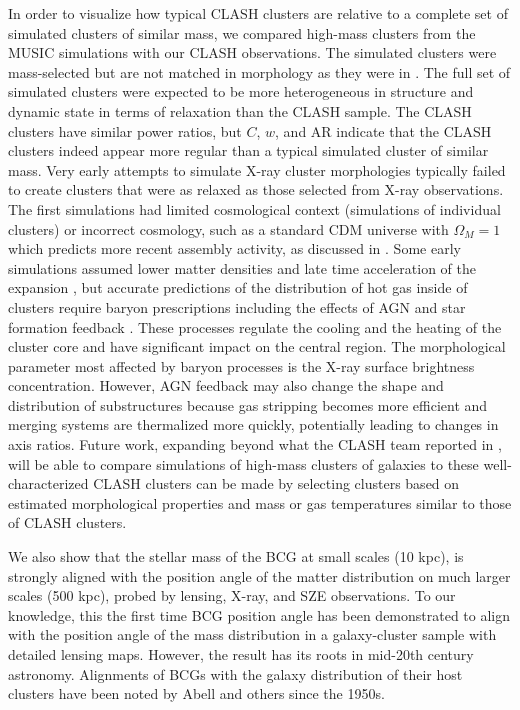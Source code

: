 \documentclass[iop,twocolumn]{emulateapj}
\begin{document}
{In order to visualize how typical CLASH clusters are relative to a complete set of simulated clusters
of similar mass, 
we compared high-mass clusters from the MUSIC simulations \citep{2014ApJ...797...34M}
with our CLASH observations. The simulated clusters were mass-selected but are not matched in morphology 
as they were in \citet{2014ApJ...797...34M}.
The full set of simulated clusters were expected to be more heterogeneous in structure and dynamic state in terms of relaxation than the CLASH sample. 
The CLASH clusters have similar power ratios, but $C$, $w$, and AR indicate
that the CLASH clusters indeed appear more regular than a typical simulated cluster of similar mass. 
Very early attempts to simulate X-ray cluster morphologies typically failed to create 
clusters that were as relaxed as those selected from X-ray observations. 
The first simulations had limited cosmological context (simulations of individual 
clusters) or incorrect cosmology, such as 
a standard CDM universe with $\Omega_M=1$ which predicts more recent assembly activity, 
as discussed in \citep{1996MNRAS.282...77T,1997MNRAS.284..439B}.  Some early simulations assumed 
lower matter densities  \citep{1993ApJ...419L...9E,1995ApJ...447....8M} and late time acceleration of the expansion \citep{1998MNRAS.296.1061T}, 
but accurate predictions 
of the distribution of hot gas inside of clusters require baryon prescriptions including
the effects of AGN and star formation feedback \citep{rasia.etal.2015}.
These processes regulate the cooling and the heating of the cluster core and have significant impact
on the central region. The morphological parameter most affected by baryon processes is the X-ray surface brightness concentration.
However, AGN feedback may also change the shape and distribution of substructures because gas stripping 
becomes more efficient and merging systems are thermalized more quickly, potentially leading to changes in axis ratios.  
Future work, expanding beyond what the CLASH team reported in \citet{2014ApJ...797...34M}, will be able to compare simulations of high-mass clusters of galaxies to 
these well-characterized CLASH clusters can be made by selecting 
clusters based on estimated morphological
properties and mass or gas temperatures similar to those of CLASH clusters.

We also show that the stellar mass of the BCG at small scales (10 kpc), is strongly aligned with the position 
angle of the matter distribution on much larger scales (500 kpc), probed by lensing, X-ray, and SZE observations.  
To our knowledge, this the first time BCG position angle has been demonstrated to align with the position angle
of the mass distribution in a galaxy-cluster sample with detailed lensing maps.  However, the result has its roots in mid-20th century astronomy.  Alignments of BCGs with the galaxy distribution of their host clusters have been noted by Abell and others since the 1950s. 

}
\end{document}
